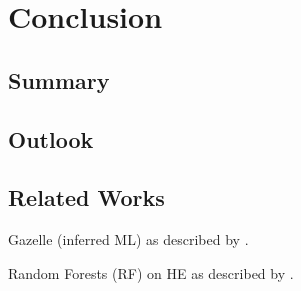\chapter{Conclusion}
\label{chap:conclusion}
\section{Summary}

\section{Outlook}

\section{Related Works}
Gazelle (inferred ML) as described by \cite{2018-gazelle}.

Random Forests (RF) on HE as described by \cite{2020-cryptotree}.
